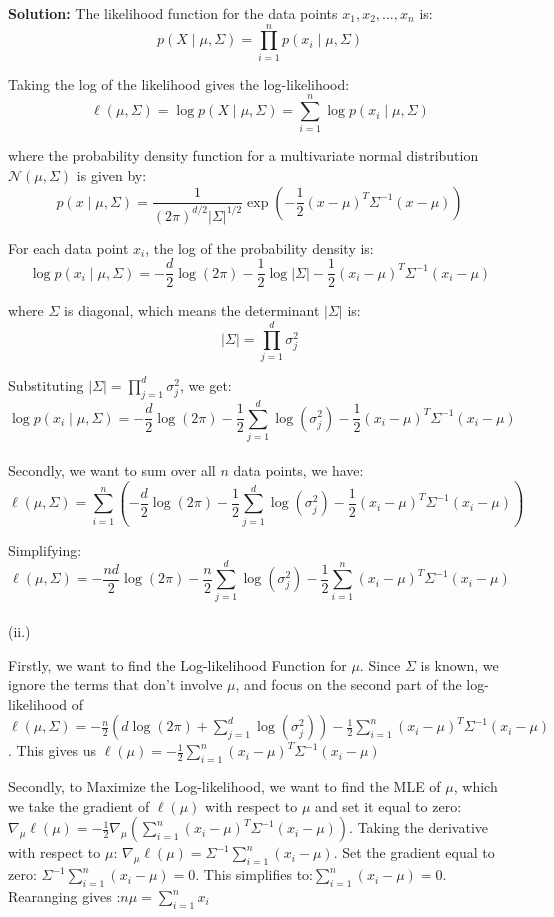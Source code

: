 \documentclass{article}
\newenvironment{solution}{\color{blue} \smallskip \textbf{Solution:}}{}
\begin{document}
\begin{enumerate}[(a)]
\begin{solution}
The likelihood function for the data points \( x_1, x_2, \dots, x_n \) is:
\[
p(X \mid \mu, \Sigma) = \prod_{i=1}^{n} p(x_i \mid \mu, \Sigma)
\]

Taking the log of the likelihood gives the log-likelihood:
\[
\ell(\mu, \Sigma) = \log p(X \mid \mu, \Sigma) = \sum_{i=1}^{n} \log p(x_i \mid \mu, \Sigma)
\]

where the probability density function for a multivariate normal distribution \( \mathcal{N}(\mu, \Sigma) \) is given by:
\[
p(x \mid \mu, \Sigma) = \frac{1}{(2\pi)^{d/2} |\Sigma|^{1/2}} \exp\left( -\frac{1}{2} (x - \mu)^T \Sigma^{-1} (x - \mu) \right)
\]

For each data point \( x_i \), the log of the probability density is:
\[
\log p(x_i \mid \mu, \Sigma) = -\frac{d}{2} \log(2\pi) - \frac{1}{2} \log |\Sigma| - \frac{1}{2} (x_i - \mu)^T \Sigma^{-1} (x_i - \mu)
\]

where \( \Sigma \) is diagonal, which means the determinant \( |\Sigma| \) is:
\[
|\Sigma| = \prod_{j=1}^{d} \sigma_j^2
\]

Substituting \( |\Sigma| = \prod_{j=1}^{d} \sigma_j^2 \), we get:
\[
\log p(x_i \mid \mu, \Sigma) = -\frac{d}{2} \log(2\pi) - \frac{1}{2} \sum_{j=1}^{d} \log(\sigma_j^2) - \frac{1}{2} (x_i - \mu)^T \Sigma^{-1} (x_i - \mu)
\]\\

Secondly, we want to sum over all \( n \) data points, we have:
\[
\ell(\mu, \Sigma) = \sum_{i=1}^{n} \left( -\frac{d}{2} \log(2\pi) - \frac{1}{2} \sum_{j=1}^{d} \log(\sigma_j^2) - \frac{1}{2} (x_i - \mu)^T \Sigma^{-1} (x_i - \mu) \right)
\]

Simplifying:
\[
\ell(\mu, \Sigma) = -\frac{nd}{2} \log(2\pi) - \frac{n}{2} \sum_{j=1}^{d} \log(\sigma_j^2) - \frac{1}{2} \sum_{i=1}^{n} (x_i - \mu)^T \Sigma^{-1} (x_i - \mu)
\]\\

(ii.)

Firstly, we want to find the Log-likelihood Function for \( \mu \). Since \( \Sigma \) is known, we ignore the terms that don't involve \( \mu \), and focus on the second part of the log-likelihood of \(\ell(\mu, \Sigma) = -\frac{n}{2} \left( d \log(2\pi) + \sum_{j=1}^{d} \log(\sigma_j^2) \right) - \frac{1}{2} \sum_{i=1}^{n} (x_i - \mu)^T \Sigma^{-1} (x_i - \mu)\). This gives us \(\ell(\mu) = -\frac{1}{2} \sum_{i=1}^{n} (x_i - \mu)^T \Sigma^{-1} (x_i - \mu)\)

Secondly, to Maximize the Log-likelihood, we want to find the MLE of \( \mu \), which we take the gradient of \( \ell(\mu) \) with respect to \( \mu \) and set it equal to zero:\(
\nabla_{\mu} \ell(\mu) = -\frac{1}{2} \nabla_{\mu} \left( \sum_{i=1}^{n} (x_i - \mu)^T \Sigma^{-1} (x_i - \mu) \right)
\). Taking the derivative with respect to \( \mu \): \(\nabla_{\mu} \ell(\mu) = \Sigma^{-1} \sum_{i=1}^{n} (x_i - \mu)
\). Set the gradient equal to zero: \(\Sigma^{-1} \sum_{i=1}^{n} (x_i - \mu) = 0\). This simplifies to:\(\sum_{i=1}^{n} (x_i - \mu) = 0\). Rearanging gives :\(n \mu = \sum_{i=1}^{n} x_i\)


\end{solution}
\end{enumerate}
\end{document}
